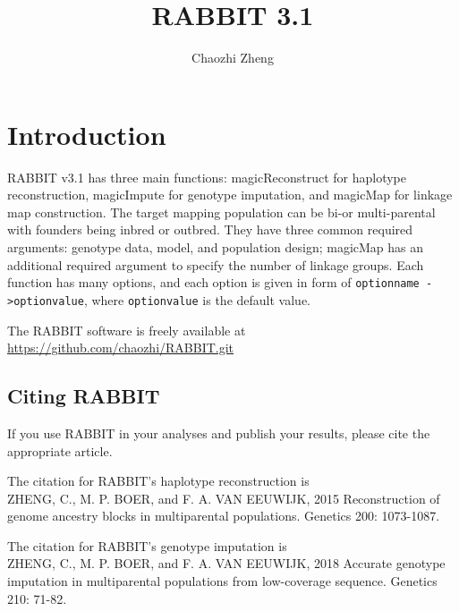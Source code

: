 \documentclass[12pt]{article}
\begin{document}
\title{RABBIT 3.1}
\author{Chaozhi Zheng \\
  }
\maketitle
\thispagestyle{empty}

\clearpage

\tableofcontents

\newpage

\section{Introduction}

RABBIT v3.1 has three main functions: magicReconstruct for haplotype reconstruction, magicImpute for genotype imputation, and magicMap for linkage map construction. The target mapping population can be bi-or multi-parental with founders being inbred or outbred. They have three common required arguments: genotype data, model, and population design; magicMap has an additional required argument to specify the number of linkage groups. Each function has many options, and each option is given in form of \verb|optionname ->optionvalue|, where \verb|optionvalue| is the default value. 

The RABBIT software is freely available at \url{https://github.com/chaozhi/RABBIT.git}

\subsection{Citing RABBIT}
If you use RABBIT in your analyses and publish your results, please cite the appropriate article. 

\vspace{12pt}
The citation for RABBIT's haplotype reconstruction is \\
ZHENG, C., M. P. BOER, and F. A. VAN EEUWIJK, 2015 Reconstruction of genome ancestry blocks in multiparental populations. Genetics 200: 1073-1087.

\vspace{12pt}
The citation for RABBIT's genotype imputation is \\
ZHENG, C., M. P. BOER, and F. A. VAN EEUWIJK, 2018 Accurate genotype imputation in multiparental populations from low-coverage sequence. Genetics 210: 71-82.
\end{document}

